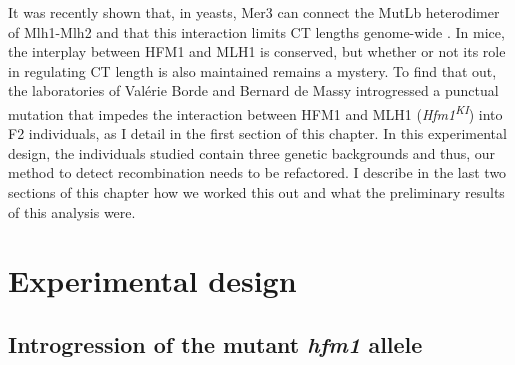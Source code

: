 It was recently shown that, in yeasts, Mer3 can connect the MutL\textgreek{b} heterodimer of Mlh1-Mlh2 and that this interaction limits CT lengths genome-wide \citep{duroc2017concerted}.
In mice, the interplay between HFM1 and MLH1 is conserved, but whether or not its role in regulating CT length is also maintained remains a mystery.
To find that out, the laboratories of Valérie Borde and Bernard de Massy introgressed a punctual mutation that impedes the interaction between HFM1 and MLH1 (\textit{Hfm1\textsuperscript{KI}}) into F2 individuals, as I detail in the first section of this chapter.
In this experimental design, the individuals studied contain three genetic backgrounds and thus, our method to detect recombination needs to be refactored.
I describe in the last two sections of this chapter how we worked this out and what the preliminary results of this analysis were.



\section{Experimental design}
\subsection{Introgression of the mutant \textit{hfm1} allele}



